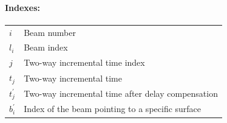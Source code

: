 \documentclass[11pt,a4paper]{article}
\begin{document}
\paragraph*{Indexes:}
\begin{table}[H]
\hspace{-0.2cm}\begin{tabular}{m{}m{}}

$i$  & Beam number \\

$l_i$ & Beam index \\

$j$ & Two-way incremental time index \\

$t_j$ & Two-way incremental time \\

$t_j^\prime$ & Two-way incremental time after delay compensation \\

$b^\prime_i$ & Index of the beam pointing to a specific surface \\

\end{tabular}
\end{table}
\end{document}
